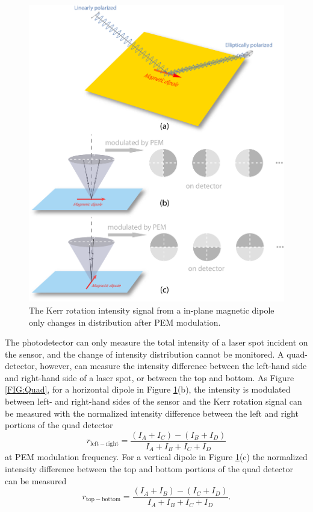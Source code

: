 \documentclass[pdflatex, sectionletters, 12pt, final, phd]{pittetd}    %
\begin{document}
\begin{figure}[p]
	\centering
	\includegraphics[width=.9\textwidth]{Drawing/KerrInPlane.pdf}
	\caption[The Kerr rotation intensity signal from a in-plane magnetic dipole]{The Kerr rotation intensity signal from a in-plane magnetic dipole only changes in distribution after PEM modulation.}
	\label{FIG:KerrInPlane}
\end{figure}

The photodetector can only measure the total intensity of a laser spot incident on the sensor, and the change of intensity distribution cannot be monitored. A quad-detector, however, can measure the intensity difference between the left-hand side and right-hand side of a laser spot, or between the top and bottom. As Figure \ref{FIG:Quad}, for a horizontal dipole in Figure \ref{FIG:KerrInPlane}(b), the intensity is modulated between left- and right-hand sides of the sensor and the Kerr rotation signal can be measured with the normalized intensity difference between the left and right portions of the quad detector
$$
r_\mathrm{left-right} = \frac{(I_A + I_C) - (I_B + I_D)}{I_A + I_B + I_C + I_D}
$$
at PEM modulation frequency. For a vertical dipole in Figure \ref{FIG:KerrInPlane}(c) the normalized intensity difference between the top and bottom portions of the quad detector can be measured
$$
r_\mathrm{top-bottom} = \frac{(I_A + I_B) - (I_C + I_D)}{I_A + I_B + I_C + I_D}.
$$
\end{document}
